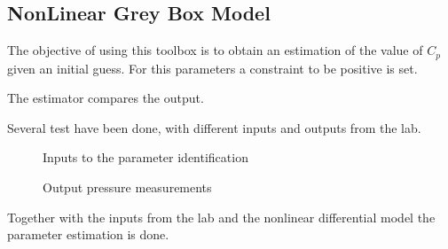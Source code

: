 \subsection{NonLinear Grey Box Model}
The objective of using this toolbox is to obtain an estimation of the value of $C_p$ given an initial guess. For this parameters a constraint to be 
positive is set. 

The estimator compares the output. 

Several test have been done, with different inputs and outputs from the lab.


\begin{figure}[H]
\centering
\resizebox{0.75\linewidth}{!}{}
% 
\caption{Inputs to the parameter identification}
\label{systemdiagram}
\end{figure} 

\begin{figure}[H]
\centering
\resizebox{0.75\linewidth}{!}{}
% 
\caption{Output pressure measurements}
\label{systemdiagram}
\end{figure} 

Together with the inputs from the lab and the nonlinear differential model the parameter estimation is done. 

% 